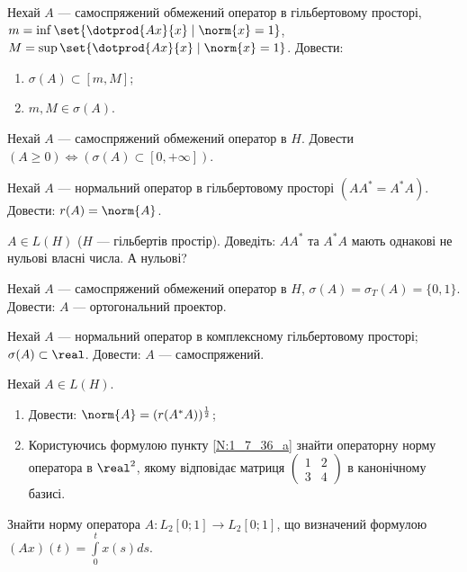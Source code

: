 
\begin{exercise}
    Нехай $A$ --- самоспряжений обмежений оператор в гільбертовому просторі,
    $m = \inf\set{\dotprod{Ax}{x} \mid \norm{x}=1}$,
    $M = \sup\set{\dotprod{Ax}{x} \mid \norm{x}=1}$.
    Довести:
    \begin{enumerate}
        \item $\sigma(A) \subset [m,M]$;
        \item $m,M \in \sigma(A)$.
    \end{enumerate}
\end{exercise}

\begin{exercise}
    Нехай $A$ --- самоспряжений обмежений оператор в $H$. Довести $(A \geq 0)
    \Leftrightarrow (\sigma(A) \subset [0,+\infty])$.
\end{exercise}

\begin{exercise}
    Нехай $A$ --- нормальний оператор в гільбертовому просторі $(AA^* = A^* A)$.
    Довести: $r(A) = \norm{A}$.
\end{exercise}

\begin{exercise}
    $A \in L(H)$ ($H$ --- гільбертів простір). Доведіть: $AA^*$ та $A^* A$ мають
    однакові не нульові власні числа. А нульові?
\end{exercise}

\begin{exercise}
    Нехай $A$ --- самоспряжений обмежений оператор в $H$, $\sigma(A) = \sigma_T(A)
    = \{0,1\}$. Довести: $A$ --- ортогональний проектор.
\end{exercise}

\begin{exercise}
    Нехай $A$ --- нормальний оператор в комплексному гільбертовому просторі;
    $\sigma(A) \subset \real$. Довести: $A$ --- самоспряжений.
\end{exercise}

\begin{exercise}
    Нехай $A \in L(H)$.
    \begin{enumerate}
        \item\label{N:1_7_36_a} Довести: $\norm{A} = (r(A^*A))^{\frac{1}{2}}$;
        \item Користуючись формулою пункту \ref{N:1_7_36_a} знайти операторну
        норму оператора в $\real^2$, якому відповідає матриця $\begin{pmatrix}
        1 & 2 \\ 3 & 4 \end{pmatrix}$ в канонічному базисі.
    \end{enumerate}
\end{exercise}

\begin{exercise}
    Знайти норму оператора $A: L_2[0;1] \to L_2[0;1]$, що визначений формулою
    $(Ax)(t) = \int\limits^t_0 x(s)ds$.
\end{exercise}